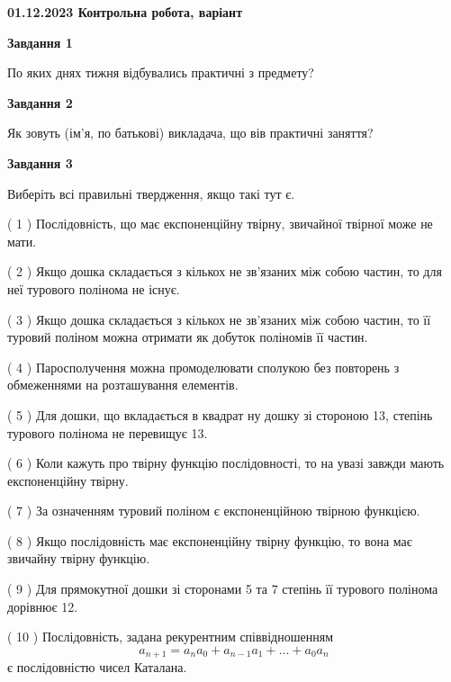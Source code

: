 \documentclass[12pt, ukrainian]{article}
\begin{document}
\begin {large}

\textbf{01.12.2023 Контрольна робота, варіант  }\par


{
{\begin {center}\textbf{Завдання 1}\end {center}}\par
По яких днях тижня відбувались практичні з предмету?\par
{\begin {center}\textbf{Завдання 2}\end {center}}\par
Як зовуть (ім'я, по батькові) викладача, що вів практичні заняття?\par
{\begin {center}\textbf{Завдання 3}\end {center}}\par
Виберіть всі правильні твердження, якщо такі тут є.\par
\vspace{2mm}
( 1 ) Послідовність, що має експоненційну твірну, звичайної твірної може не мати.%

( 2 ) Якщо дошка складається з кількох не зв’язаних між собою частин, то для неї турового полінома не існує.%

( 3 ) Якщо дошка складається з кількох не зв’язаних між собою частин, то її туровий поліном можна отримати як добуток поліномів її частин.%

( 4 ) Паросполучення можна промоделювати сполукою без повторень з обмеженнями на розташування елементів.%

( 5 ) Для дошки, що вкладається в квадрат ну дошку зі стороною 13, степінь турового полінома не перевищує 13.%

( 6 ) Коли кажуть про твірну функцію послідовності, то на увазі завжди мають експоненційну твірну.%

( 7 ) За означенням туровий поліном є експоненційною твірною функцією.%

( 8 ) Якщо послідовність має експоненційну твірну функцію, то вона має звичайну твірну функцію.%

( 9 ) Для прямокутної дошки зі сторонами 5 та 7 степінь її турового полінома дорівнює 12.%

( 10 ) Послідовність, задана рекурентним співвідношенням $$a_{n+1}=a_{n}a_{0}+a_{n-1}a_{1}+\ldots+a_0a_{n}$$ є послідовністю чисел Каталана.%
}
\end {large}

\vspace{4mm}
\newpage
\end{document}
